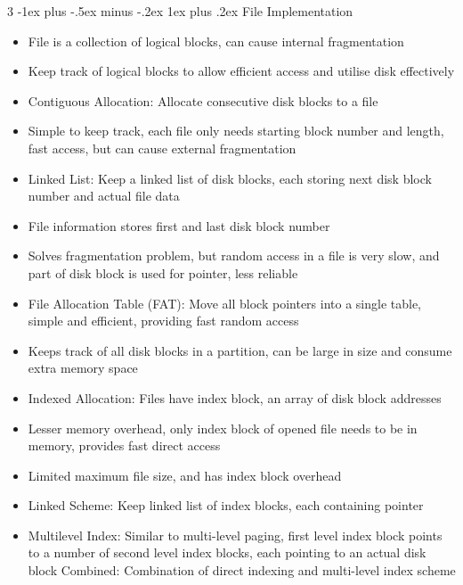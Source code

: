 \documentclass[10pt, landscape]{article}
\makeatletter
\renewcommand{\subsection}{\@startsection{subsection}{3}{0mm}%
                                {-1ex plus -.5ex minus -.2ex}%
                                {1ex plus .2ex}%
                                {\normalfont\small\bfseries}}%
\makeatother
\begin{document}
\begin{multicols*}{3}
\subsection{File Implementation}
\begin{itemize}
    \item File is a collection of logical blocks, can cause internal fragmentation
    \item Keep track of logical blocks to allow efficient access and utilise disk effectively
    \item Contiguous Allocation: Allocate consecutive disk blocks to a file
    \item Simple to keep track, each file only needs starting block number and length, fast access, but can cause external fragmentation
    \item Linked List: Keep a linked list of disk blocks, each storing next disk block number and actual file data
    \item File information stores first and last disk block number
    \item Solves fragmentation problem, but random access in a file is very slow, and part of disk block is used for pointer, less reliable
    \item File Allocation Table (FAT): Move all block pointers into a single table, simple and efficient, providing fast random access
    \item Keeps track of all disk blocks in a partition, can be large in size and consume extra memory space
    \item Indexed Allocation: Files have index block, an array of disk block addresses
    \item Lesser memory overhead, only index block of opened file needs to be in memory, provides fast direct access
    \item Limited maximum file size, and has index block overhead
    \item Linked Scheme: Keep linked list of index blocks, each containing pointer
    \item Multilevel Index: Similar to multi-level paging, first level index block points to a number of second level index blocks, each pointing to an actual disk block
    Combined: Combination of direct indexing and multi-level index scheme
\end{itemize}


\end{multicols*}
\end{document}
